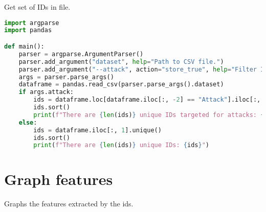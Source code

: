 Get set of IDs in file.

\begin{lstlisting}[language=Python]
import argparse
import pandas

def main():
    parser = argparse.ArgumentParser()
    parser.add_argument("dataset", help="Path to CSV file.")
    parser.add_argument("--attack", action="store_true", help="Filter IDs that are attacked.")
    args = parser.parse_args()
    dataframe = pandas.read_csv(parser.parse_args().dataset)
    if args.attack:
        ids = dataframe.loc[dataframe.iloc[:, -2] == "Attack"].iloc[:, 1].unique()
        ids.sort()
        print(f"There are {len(ids)} unique IDs targeted for attacks: {ids}")
    else:
        ids = dataframe.iloc[:, 1].unique()
        ids.sort()
        print(f"There are {len(ids)} unique IDs: {ids}")
\end{lstlisting}

\section{Graph features}

Graphs the features extracted by the \gls{ids}.

